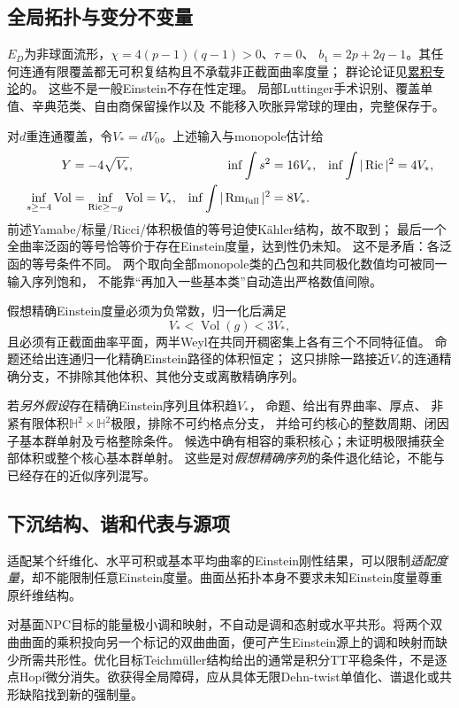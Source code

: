 \documentclass[UTF8,a4paper,11pt,fontset=fandol]{ctexart}
\numberwithin{equation}{section}
\theoremstyle{definition}
\newcommand{\Ric}{\operatorname{Ric}}
\newcommand{\Rm}{\operatorname{Rm}}
\newcommand{\Vol}{\operatorname{Vol}}
\begin{document}
\subsection{全局拓扑与变分不变量}
$E_D$为非球面流形，$\chi=4(p-1)(q-1)>0$、$\tau=0$、
$b_1=2p+2q-1$。其任何连通有限覆盖都无可积复结构且不承载非正截面曲率度量；
群论论证见\href{20260912.tex}{累积专论}的。
这些不是一般Einstein不存在性定理。
局部Luttinger手术识别、覆盖单值、辛典范类、自由商保留操作以及
不能移入吹胀异常球的理由，完整保存于。

对$d$重连通覆盖，令$V_*=dV_0$。上述输入与monopole估计给
\begin{align}
 Y&=-4\sqrt{V_*},&
 \inf\int s^2&=16V_*,&\inf\int|\Ric|^2&=4V_*,\notag\\
 \inf_{s\ge-4}\Vol&=\inf_{\Ric\ge-g}\Vol=V_*,&
 \inf\int|\Rm_{\rm full}|^2&=8V_* .\label{eq:bundlefunctionals}
\end{align}
前述Yamabe/标量/Ricci/体积极值的等号迫使Kähler结构，故不取到；
最后一个全曲率泛函的等号恰等价于存在Einstein度量，达到性仍未知。
这不是矛盾：各泛函的等号条件不同。
两个取向全部monopole类的凸包和共同极化数值均可被同一输入序列饱和，
不能靠“再加入一些基本类”自动造出严格数值间隙。

假想精确Einstein度量必须为负常数，归一化后满足
\[
 V_*<\Vol(g)<3V_*,
\]
且必须有正截面曲率平面，两半Weyl在共同开稠密集上各有三个不同特征值。
命题还给出连通归一化精确Einstein路径的体积恒定；
这只排除一路接近$V_*$的连通精确分支，不排除其他体积、其他分支或离散精确序列。

若\emph{另外假设}存在精确Einstein序列且体积趋$V_*$，
命题、给出有界曲率、厚点、
非紧有限体积$\mathbb H^2\times\mathbb H^2$极限，排除不可约格点分支，
并给可约核心的整数周期、闭因子基本群单射及亏格整除条件。
候选中确有相容的乘积核心；未证明极限捕获全部体积或整个核心基本群单射。
这些是对\emph{假想精确序列}的条件退化结论，不能与已经存在的近似序列混写。

\subsection{下沉结构、谐和代表与源项}

适配某个纤维化、水平可积或基本平均曲率的Einstein刚性结果，可以限制\emph{适配度量}，却不能限制任意Einstein度量。曲面丛拓扑本身不要求未知Einstein度量尊重原纤维结构。

对基面NPC目标的能量极小调和映射，不自动是调和态射或水平共形。将两个双曲曲面的乘积投向另一个标记的双曲曲面，便可产生Einstein源上的调和映射而缺少所需共形性。优化目标Teichm\"uller结构给出的通常是积分TT平稳条件，不是逐点Hopf微分消失。欲获得全局障碍，应从具体无限Dehn-twist单值化、谱退化或共形缺陷找到新的强制量。
\end{document}
